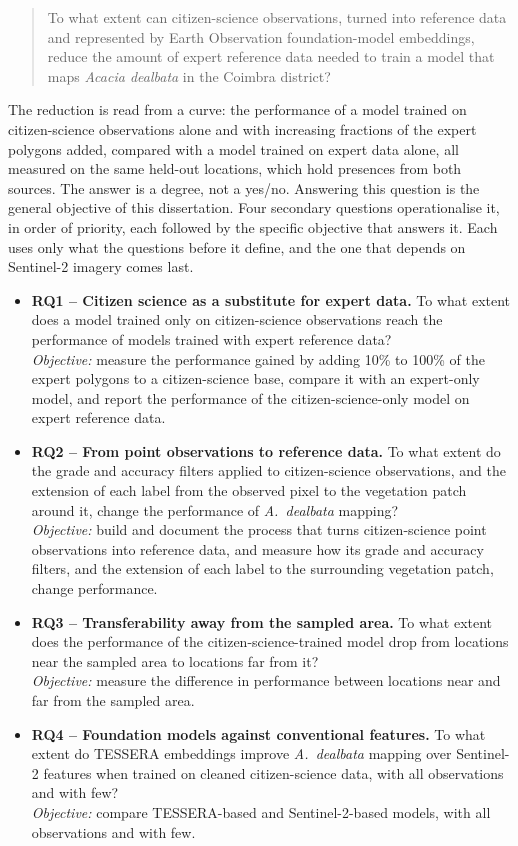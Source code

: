 \begin{quote}
To what extent can citizen-science observations, turned into
reference data and represented by Earth Observation foundation-model
embeddings, reduce the amount of expert reference data needed to
train a model that maps \emph{Acacia dealbata} in the Coimbra
district?
\end{quote}

The reduction is read from a curve: the performance of a model trained
on citizen-science observations alone and with increasing fractions of
the expert polygons added, compared with a model trained on expert
data alone, all measured on the same held-out locations, which hold
presences from both sources. The answer is a degree, not a yes/no.
Answering this question is the general objective of this
dissertation. Four secondary questions operationalise it, in order of
priority, each followed by the specific objective that answers it.
Each uses only what the questions before it define, and the one that
depends on Sentinel-2 imagery comes last.

\begin{itemize}
  \item \textbf{RQ1 -- Citizen science as a substitute for expert
  data.} To what extent does a model trained only on citizen-science
  observations reach the performance of models trained with expert
  reference data?\\
  \emph{Objective:} measure the performance gained by adding 10\% to
  100\% of the expert polygons to a citizen-science base, compare it
  with an expert-only model, and report the performance of the
  citizen-science-only model on expert reference data.
  \item \textbf{RQ2 -- From point observations to reference data.} To
  what extent do the grade and accuracy filters applied to
  citizen-science observations, and the extension of each label from
  the observed pixel to the vegetation patch around it, change the
  performance of \emph{A.~dealbata} mapping?\\
  \emph{Objective:} build and document the process that turns
  citizen-science point observations into reference data, and measure
  how its grade and accuracy filters, and the extension of each label
  to the surrounding vegetation patch, change performance.
  \item \textbf{RQ3 -- Transferability away from the sampled area.}
  To what extent does the performance of the citizen-science-trained
  model drop from locations near the sampled area to locations far
  from it?\\
  \emph{Objective:} measure the difference in performance between
  locations near and far from the sampled area.
  \item \textbf{RQ4 -- Foundation models against conventional
  features.} To what extent do TESSERA embeddings improve
  \emph{A.~dealbata} mapping over Sentinel-2 features when trained on
  cleaned citizen-science data, with all observations and with few?\\
  \emph{Objective:} compare TESSERA-based and Sentinel-2-based models,
  with all observations and with few.
\end{itemize}

